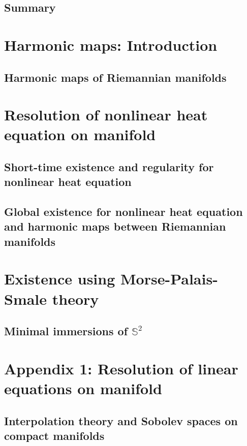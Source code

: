 \documentclass[12pt]{book}
\begin{document}
\newpage

\tableofcontents
\chapter{Summary}


\part{Harmonic maps: Introduction}
\chapter{Harmonic maps of Riemannian manifolds}


\part{Resolution of nonlinear heat equation on manifold}
\chapter{Short-time existence and regularity for nonlinear heat equation}


\chapter[Global existence for nonlinear heat equation]{Global existence for nonlinear heat equation and harmonic maps between Riemannian manifolds}


\part{Existence using Morse-Palais-Smale theory}
\chapter{Minimal immersions of $\mathbb{S}^2$}


\part{Appendix 1: Resolution of linear equations on manifold}

\chapter{Interpolation theory and Sobolev spaces on compact manifolds }

\end{document}
